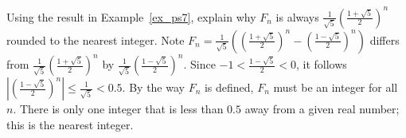 {Using the result in Example~\ref{ex_ps7}, explain why $F_n$ is always $\frac{1}{\sqrt{5}} \left( \frac{1+\sqrt{5}}{2} \right)^n$ rounded to the nearest integer.
}
{Note $F_n=\frac{1}{\sqrt{5}}\left(\left(\frac{1+\sqrt{5}}{2}\right)^n - \left(\frac{1-\sqrt{5}}{2}\right)^n\right)$ differs from $\frac{1}{\sqrt{5}} \left( \frac{1+\sqrt{5}}{2} \right)^n$ by $\frac{1}{\sqrt{5}}\left(\frac{1-\sqrt{5}}{2}\right)^n$.  Since $-1<\frac{1-\sqrt{5}}{2}<0$, it follows $\left|\left(\frac{1-\sqrt{5}}{2}\right)^n\right|\leq \frac{1}{\sqrt{5}}< 0.5$.  By the way $F_n$ is defined, $F_n$ must be an integer for all $n$.  There is only one integer that is less than $0.5$ away from a given real number; this is the nearest integer.
}